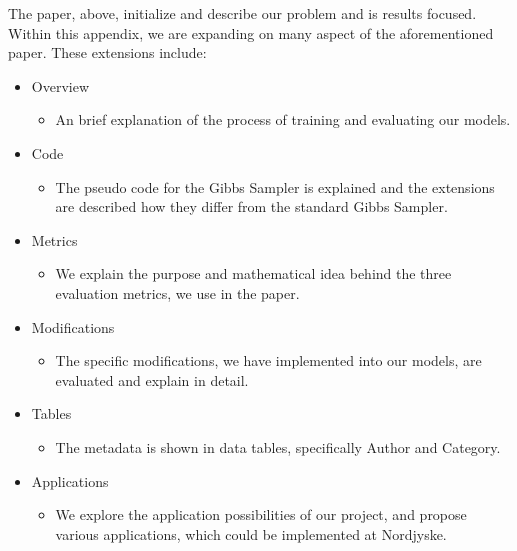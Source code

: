 The paper, above, initialize and describe our problem and is results focused.
Within this appendix, we are expanding on many aspect of the aforementioned paper.
These extensions include:
\begin{itemize}
	\item Overview
	\begin{itemize}
		\item An brief explanation of the process of training and evaluating our models.
	\end{itemize}
	\item Code
	\begin{itemize}
		\item The pseudo code for the Gibbs Sampler is explained and the extensions are described how they differ from the standard Gibbs Sampler. 
	\end{itemize}
	\item Metrics 
	\begin{itemize}
		\item We explain the purpose and mathematical idea behind the three evaluation metrics, we use in the paper.
	\end{itemize}
	\item Modifications 
	\begin{itemize}
		\item The specific modifications, we have implemented into our models, are evaluated and explain in detail.
	\end{itemize}
	\item Tables
	\begin{itemize}
		\item The metadata is shown in data tables, specifically Author and Category.
	\end{itemize}
	\item Applications
	\begin{itemize}
		\item We explore the application possibilities of our project, and propose various applications, which could be implemented at Nordjyske.
	\end{itemize}
\end{itemize}